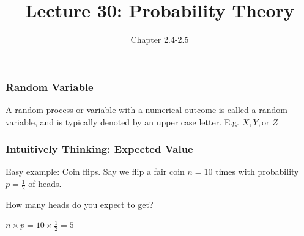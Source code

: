 \documentclass[handout]{beamer}
\title{Lecture 30: Probability Theory}
\author{Chapter 2.4-2.5}
\date{}
\newcommand{\blue}[1]{\textcolor{blue2}{#1}}
\begin{document}
\begin{frame}
\titlepage
\end{frame}


\begin{frame}[fragile]
\frametitle{Random Variable}

%
%
A random process or variable with a numerical outcome is called a \blue{random variable}, and is typically denoted by an upper case letter.  E.g. $X, Y, \mbox{or } Z$

\end{frame}


\begin{frame}
\frametitle{Intuitively Thinking: Expected Value}
 
%
% 
Easy example:  Coin flips.  Say we flip a fair coin $n=10$ times with probability $p=\frac{1}{2}$ of heads.

\pause
\vspace{0.5cm}

How many heads do you \blue{expect} to get?

\vspace{0.5cm}

$n \times p = 10 \times \frac{1}{2} = 5$

\end{frame}
\end{document}
